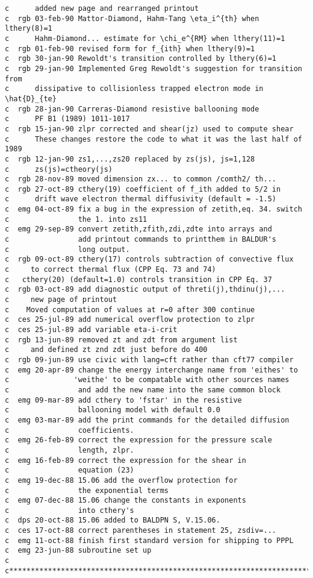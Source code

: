 \begin{verbatim}
c      added new page and rearranged printout
c  rgb 03-feb-90 Mattor-Diamond, Hahm-Tang \eta_i^{th} when lthery(8)=1
c      Hahm-Diamond... estimate for \chi_e^{RM} when lthery(11)=1
c  rgb 01-feb-90 revised form for f_{ith} when lthery(9)=1
c  rgb 30-jan-90 Rewoldt's transition controlled by lthery(6)=1
c  rgb 29-jan-90 Implemented Greg Rewoldt's suggestion for transition from
c      dissipative to collisionless trapped electron mode in \hat{D}_{te}
c  rgb 28-jan-90 Carreras-Diamond resistive ballooning mode
c      PF B1 (1989) 1011-1017
c  rgb 15-jan-90 zlpr corrected and shear(jz) used to compute shear
c      These changes restore the code to what it was the last half of 1989
c  rgb 12-jan-90 zs1,...,zs20 replaced by zs(js), js=1,128
c      zs(js)=ctheory(js)
c  rgb 28-nov-89 moved dimension zx... to common /comth2/ th...
c  rgb 27-oct-89 cthery(19) coefficient of f_ith added to 5/2 in
c      drift wave electron thermal diffusivity (default = -1.5)
c  emg 04-oct-89 fix a bug in the expression of zetith,eq. 34. switch
c                the 1. into zs11
c  emg 29-sep-89 convert zetith,zfith,zdi,zdte into arrays and
c                add printout commands to printthem in BALDUR's
c                long output.
c  rgb 09-oct-89 cthery(17) controls subtraction of convective flux
c     to correct thermal flux (CPP Eq. 73 and 74)
c   cthery(20) (default=1.0) controls transition in CPP Eq. 37
c  rgb 03-oct-89 add diagnostic output of threti(j),thdinu(j),...
c     new page of printout
c    Moved computation of values at r=0 after 300 continue
c  ces 25-jul-89 add numerical overflow protection to zlpr
c  ces 25-jul-89 add variable eta-i-crit
c  rgb 13-jun-89 removed zt and zdt from argument list
c     and defined zt znd zdt just before do 400
c  rgb 09-jun-89 use civic with lang=cft rather than cft77 compiler
c  emg 20-apr-89 change the energy interchange name from 'eithes' to
c               'weithe' to be compatable with other sources names
c                and add the new name into the same common block
c  emg 09-mar-89 add cthery to 'fstar' in the resistive
c                ballooning model with default 0.0
c  emg 03-mar-89 add the print commands for the detailed diffusion
c                coefficients.
c  emg 26-feb-89 correct the expression for the pressure scale
c                length, zlpr.
c  emg 16-feb-89 correct the expression for the shear in
c                equation (23)
c  emg 19-dec-88 15.06 add the overflow protection for
c                the exponential terms
c  emg 07-dec-88 15.06 change the constants in exponents
c                into cthery's
c  dps 20-oct-88 15.06 added to BALDPN S, V.15.06.
c  ces 17-oct-88 correct parentheses in statement 25, zsdiv=...
c  emg 11-oct-88 finish first standard version for shipping to PPPL
c  emg 23-jun-88 subroutine set up
c
c***********************************************************************
\end{verbatim}

